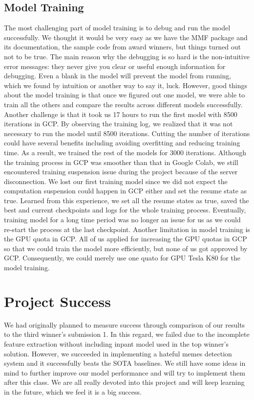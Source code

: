 \documentclass[10pt,twocolumn,letterpaper]{article}
\begin{document}
\subsection{Model Training}
The most challenging part of model training is to debug and run the model successfully. We thought it would be very easy as we have the MMF package and its documentation, the sample code from award winners, but things turned out not to be true. The main reason why the debugging is so hard is the non-intuitive error messages: they never give you clear or useful enough information for debugging. Even a blank in the model will prevent the model from running, which we found by intuition or another way to say it, luck. However, good things about the model training is that once we figured out one model, we were able to train all the others and compare the results across different models successfully. Another challenge is that it took us 17 hours to run the first model with 8500 iterations in GCP. By observing the training log, we realized that it was not necessary to run the model until 8500 iterations. Cutting the number of iterations could have several benefits including avoiding overfitting and reducing training time. As a result, we trained the rest of the models for 3000 iterations. Although the training process in GCP was smoother than that in Google Colab, we still encountered training suspension issue during the project because of the server disconnection. We lost our first training model since we did not expect the computation suspension could happen in GCP either and set the resume state as true. Learned from this experience, we set all the resume states as true, saved the best and current checkpoints and logs for the whole training process. Eventually, training model for a long time period was no longer an issue for us as we could re-start the process at the last checkpoint. Another limitation in model training is the GPU quota in GCP. All of us applied for increasing the GPU quotas in GCP so that we could train the model more efficiently, but none of us got approved by GCP. Consequently, we could merely use one quato for GPU Tesla K80 for the model training. 

\section{Project Success}
We had originally planned to measure success through comparison of our results to the third winner's submission 1. In this regard, we failed due to the incomplete feature extraction without including inpant model used in the top winner's solution. However, we succeeded in implementing a hateful memes detection system and it successfully beats the SOTA baselines. We still have some ideas in mind to further improve our model performance and will try to implement them after this class. We are all really devoted into this project and will keep learning in the future, which we feel it is a big success.
\end{document}
